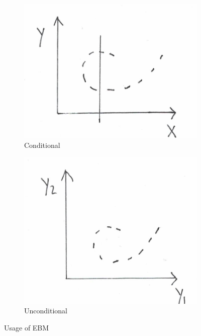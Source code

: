 \begin{figure}[htb]
    \centering
    \begin{subfigure}[b]{0.3\textwidth}
        \includegraphics[width=\textwidth]{figs/EBM3.png}
        \caption{Conditional}
        \label{fig:conditionalexample1}
    \end{subfigure}
    \begin{subfigure}[b]{0.29\textwidth}
        \includegraphics[width=\textwidth]{figs/EBM4.png}
        \caption{Unconditional}
        \label{fig:unconditionalexample1}
    \end{subfigure}
    \caption{Usage of EBM}\label{fig:Example1}
\end{figure}


